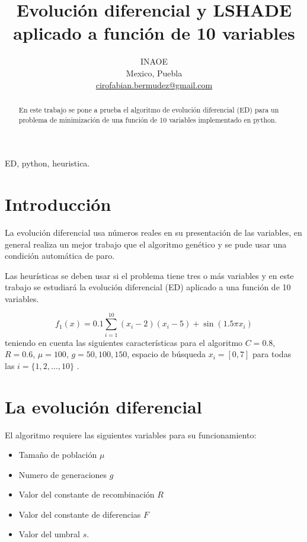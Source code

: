 \documentclass[conference]{IEEEtran}
\begin{document}
\title{Evolución diferencial y LSHADE aplicado a función de 10 variables
}

\author{
INAOE\\
Mexico, Puebla \\
\url{cirofabian.bermudez@gmail.com}
}

\maketitle

\begin{abstract}
En este trabajo se pone a prueba el algoritmo de evolución diferencial (ED) para un problema de minimización de una función de 10 variables implementado en python.
\end{abstract}

\begin{IEEEkeywords}
ED, python, heuristica.
\end{IEEEkeywords}

\section{Introducción}

La evolución diferencial usa números reales en su presentación de las variables, en general realiza un mejor trabajo que el algoritmo genético y se pude  usar una condición automática de paro. 

Las heurísticas se deben usar si el problema tiene tres o más variables y en este trabajo se estudiará la evolución diferencial (ED) aplicado a una función de 10 variables.

\begin{equation}
 f_{1}(x) = 0.1 \sum_{i=1} ^{10} (x_{i} -2)(x_{i} -5) + \sin(1.5 \pi x_{i})
 \end{equation} 
teniendo en cuenta las siguientes características para el algoritmo 
$C = 0.8$, $R = 0.6$, $\mu = 100$, $g=50, 100, 150$, espacio de búsqueda $x_{i}  = [0,7]$ para todas las $i = \{1, 2, \ldots,10\}$ .


\section{La evolución diferencial}


El algoritmo requiere las siguientes variables para su funcionamiento:
\begin{itemize}
\item Tamaño de población $\mu$
\item Numero de generaciones $g$
\item Valor del constante de recombinación $R$
\item Valor del constante de diferencias $F$
\item Valor del umbral $s$.
\end{itemize}
\end{document}
